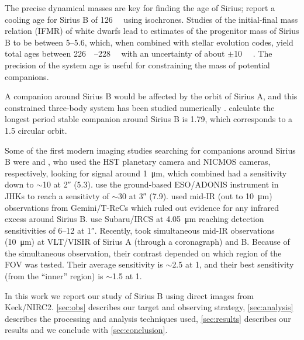 \documentclass[twocolumn]{aastex631}
\begin{document}
The precise dynamical masses are key for finding the age of Sirius; \citet{bond_sirius_2017} report a cooling age for Sirius B of \qty{126}{\mega\year} using isochrones. Studies of the initial-final mass relation (IFMR) of white dwarfs \citep{cummings_two_2016} lead to estimates of the progenitor mass of Sirius B to be between \qtyrange{5}{5.6}{\solarmass}, which, when combined with stellar evolution codes, yield total ages between \qtyrange{226}{228}{\mega\year} with an uncertainty of about $\pm$\qty{10}{\mega\year} \citep{bond_sirius_2017}. The precision of the system age is useful for constraining the mass of potential companions.

A companion around Sirius B would be affected by the orbit of Sirius A, and this constrained three-body system has been studied numerically \citep{holman_long-term_1999}. \citet{bond_sirius_2017} calculate the longest period stable companion around Sirius B is \qty{1.79}{\year}, which corresponds to a \qty{1.5}{\au} circular orbit.

Some of the first modern imaging studies searching for companions around Sirius B were \citet{schroeder_search_2000} and \citet{kuchner_search_2000}, who used the HST planetary camera and NICMOS cameras, respectively, looking for signal around \qty{1}{\micro\meter}, which combined had a sensitivity down to $\sim$\qty{10}{\jupitermass} at \ang{;;2} (\qty{5.3}{\au}). \citet{bonnet-bidaud_adonis_2008} use the ground-based ESO/ADONIS instrument in JHKs to reach a sensitivty of $\sim$\qty{30}{\jupitermass} at \ang{;;3} (\qty{7.9}{\au}). \citet{skemer_sirius_2011} used mid-IR (out to \qty{10}{\micro\meter}) observations from Gemini/T-ReCs which ruled out evidence for any infrared excess around Sirius B. \citet{thalmann_piercing_2011} use Subaru/IRCS at \qty{4.05}{\micro\meter} reaching detection sensitivities of \qtyrange{6}{12}{\jupitermass} at \ang{;;1}. Recently, \citet{pathak_high_2021} took simultaneous mid-IR observations (\qty{10}{\micro\meter}) at VLT/VISIR of Sirius A (through a coronagraph) and B. Because of the simultaneous observation, their contrast depended on which region of the FOV was tested. Their average sensitivity is $\sim$\qty{2.5}{\jupitermass} at \qty{1}{\au}, and their best sensitivity (from the ``inner'' region) is $\sim$\qty{1.5}{\jupitermass} at \qty{1}{\au}.

In this work we report our study of Sirius B using direct images from Keck/NIRC2. \autoref{sec:obs} describes our target and observing strategy, \autoref{sec:analysis} describes the processing and analysis techniques used, \autoref{sec:results} describes our results and we conclude with \autoref{sec:conclusion}.
\end{document}
